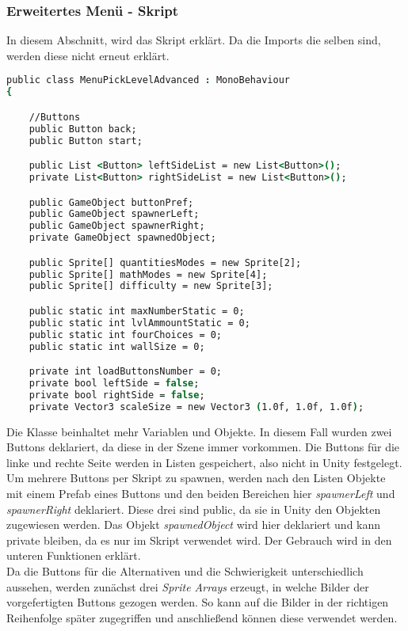 \subsubsection{Erweitertes Menü - Skript}
In diesem Abschnitt, wird das Skript erklärt. Da die Imports die selben sind, werden diese nicht erneut erklärt.
\begin{lstlisting}[language=csh, caption={MenuPickLevelAdvanced.cs Variablendeklaration}]
public class MenuPickLevelAdvanced : MonoBehaviour
{

	//Buttons
	public Button back;
	public Button start;

	public List <Button> leftSideList = new List<Button>();
	private List<Button> rightSideList = new List<Button>();

	public GameObject buttonPref;
	public GameObject spawnerLeft;
	public GameObject spawnerRight;
	private GameObject spawnedObject;

	public Sprite[] quantitiesModes = new Sprite[2];
	public Sprite[] mathModes = new Sprite[4];
	public Sprite[] difficulty = new Sprite[3];

	public static int maxNumberStatic = 0;
	public static int lvlAmmountStatic = 0;
	public static int fourChoices = 0;
	public static int wallSize = 0;

	private int loadButtonsNumber = 0;
	private bool leftSide = false;
	private bool rightSide = false;
	private Vector3 scaleSize = new Vector3 (1.0f, 1.0f, 1.0f);
\end{lstlisting}
Die Klasse beinhaltet mehr Variablen und Objekte. In diesem Fall wurden zwei Buttons deklariert, da diese in der Szene immer vorkommen. Die Buttons für die linke und rechte Seite werden in Listen gespeichert, also nicht in Unity festgelegt. Um mehrere Buttons per Skript zu spawnen, werden nach den Listen Objekte mit einem Prefab eines Buttons und den beiden Bereichen hier \textit{spawnerLeft} und \textit{spawnerRight} deklariert. Diese drei sind public, da sie in Unity den Objekten zugewiesen werden. Das Objekt \textit{spawnedObject} wird hier deklariert und kann private bleiben, da es nur im Skript verwendet wird. Der Gebrauch wird in den unteren Funktionen erklärt.\\
Da die Buttons für die Alternativen und die Schwierigkeit unterschiedlich aussehen, werden zunächst drei \textit{Sprite Arrays} erzeugt, in welche Bilder der vorgefertigten Buttons gezogen werden. So kann auf die Bilder in der richtigen Reihenfolge später zugegriffen und anschließend können diese verwendet werden.\\

